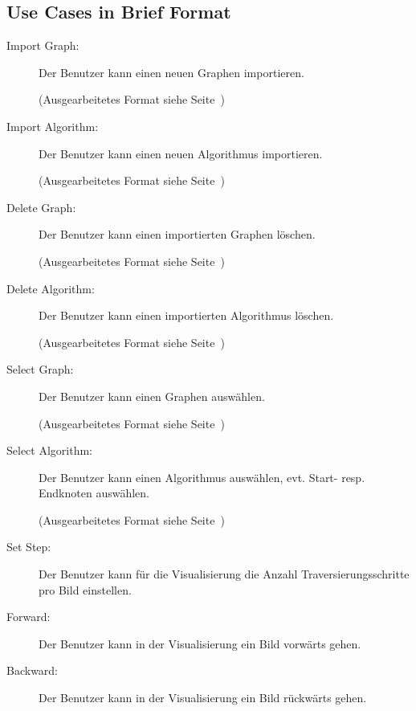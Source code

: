 \subsection{Use Cases in Brief Format}
\label{subsec:Use Cases in Brief Format}
\begin{description}
  \item[Import Graph:] Der Benutzer kann einen neuen Graphen importieren.

  (Ausgearbeitetes Format siehe Seite~\pageref{uc:Import Graph})

  \item[Import Algorithm:] Der Benutzer kann einen neuen Algorithmus importieren.

  (Ausgearbeitetes Format siehe Seite~\pageref{uc:Import Algorithm})

  \item[Delete Graph:] Der Benutzer kann einen importierten Graphen l\"oschen.

  (Ausgearbeitetes Format siehe Seite~\pageref{uc:Delete Graph})

  \item[Delete Algorithm:] Der Benutzer kann einen importierten Algorithmus l\"oschen.

  (Ausgearbeitetes Format siehe Seite~\pageref{uc:Delete Algorithm})

  \item[Select Graph:] Der Benutzer kann einen Graphen ausw\"ahlen.

  (Ausgearbeitetes Format siehe Seite~\pageref{uc:Select Graph})

  \item[Select Algorithm:] Der Benutzer kann einen Algorithmus ausw\"ahlen, evt. Start- resp. Endknoten ausw\"ahlen.

  (Ausgearbeitetes Format siehe Seite~\pageref{uc:Select Algorithm})

  \item[Set Step:] Der Benutzer kann f\"ur die Visualisierung die Anzahl Traversierungsschritte pro Bild einstellen.
% 

  \item[Forward:] Der Benutzer kann in der Visualisierung ein Bild vorw\"arts gehen.
% 

  \item[Backward:] Der Benutzer kann in der Visualisierung ein Bild r\"uckw\"arts gehen.
% 


\end{description}
